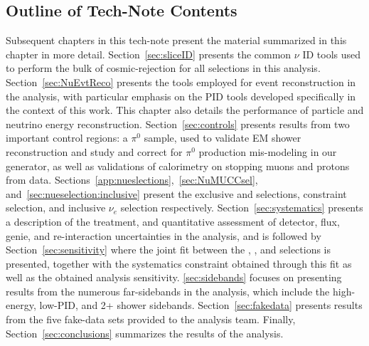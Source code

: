 

\subsection{Outline of Tech-Note Contents}
\par Subsequent chapters in this tech-note present the material summarized in this chapter in more detail. Section~\ref{sec:sliceID} presents the common $\nu$ ID tools used to perform the bulk of cosmic-rejection for all selections in this analysis. Section~\ref{sec:NuEvtReco} presents the tools employed for event reconstruction in the analysis, with particular emphasis on the PID tools developed specifically in the context of this work. This chapter also details the performance of particle and neutrino energy reconstruction. Section~\ref{sec:controls} presents results from two important control regions: a $\pi^0$ sample, used to validate EM shower reconstruction and study and correct for $\pi^0$ production mis-modeling in our generator, as well as validations of \dedx calorimetry on stopping muons and protons from data. Sections~\ref{app:nueslections},~\ref{sec:NuMUCCsel}, and~\ref{sec:nueselection:inclusive} present the exclusive \nue \npsel and \zpsel selections, constraint \numu selection, and inclusive $\nu_e$ selection respectively. Section~\ref{sec:systematics} presents a description of the treatment, and quantitative assessment of detector, flux, genie, and re-interaction uncertainties in the analysis, and is followed by Section~\ref{sec:sensitivity} where the joint fit between the \npsel, \zpsel, and \numu selections is presented, together with the systematics constraint obtained through this fit as well as the obtained analysis sensitivity. \cref{sec:sidebands} focuses on presenting results from the numerous far-sidebands in the analysis, which include the high-energy, low-PID, and 2+ shower sidebands. Section~\ref{sec:fakedata} presents results from the five fake-data sets provided to the analysis team. Finally, Section~\ref{sec:conclusions} summarizes the results of the analysis.


\newpage
